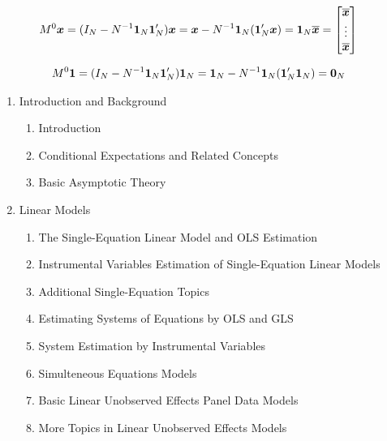 \documentclass[11pt,oneside,a4paper]{article}
\numberwithin{equation}{section}
\begin{document}
\begin{description}
\begin{description}
\vspace{-1 em}
\begin{align*}
M^{0} \boldsymbol{x} &= 
( I_{N} - N^{-1} \boldsymbol{1}_{N} \boldsymbol{1}_{N}' ) \boldsymbol{x} 
= 
\boldsymbol{x} - N^{-1} \boldsymbol{1}_{N} (\boldsymbol{1}_{N}' \boldsymbol{x}) 
=
\boldsymbol{1}_{N} \overline{\boldsymbol{x}}
=
\begin{bmatrix}
\overline{\boldsymbol{x}} \\ \vdots \\ \overline{\boldsymbol{x}}
\end{bmatrix}
\end{align*}

\vspace{-1 em}
\begin{align*}
M^{0} \boldsymbol{1} &= 
( I_{N} - N^{-1} \boldsymbol{1}_{N} \boldsymbol{1}_{N}' ) \boldsymbol{1}_{N}
= 
\boldsymbol{1}_{N} - N^{-1} \boldsymbol{1}_{N} (\boldsymbol{1}_{N}' \boldsymbol{1}_{N}) 
=
\boldsymbol{0}_{N} 
\end{align*}

%
\clearpage

\begin{center}
\end{center}



\renewcommand{\labelenumi}{\Roman{enumi}}
\renewcommand{\labelenumii}{\arabic{enumii}}
\begin{enumerate}
\item Introduction and Background

\begin{enumerate}
\item  Introduction
\item  Conditional Expectations and Related Concepts
\item  Basic Asymptotic Theory
\end{enumerate}

\item Linear Models

\begin{enumerate}
\addtocounter{enumii}{3}
\item  The Single-Equation Linear Model and OLS Estimation
\item  Instrumental Variables Estimation of Single-Equation Linear Models
\item  Additional Single-Equation Topics
\item  Estimating Systems of Equations by OLS and GLS
\item  System Estimation by Instrumental Variables
\item  Simulteneous Equations Models
\item  Basic Linear Unobserved Effects Panel Data Models
\item  More Topics in Linear Unobserved Effects Models
\end{enumerate}


\end{enumerate}
\end{description}
\end{description}
\end{document}
